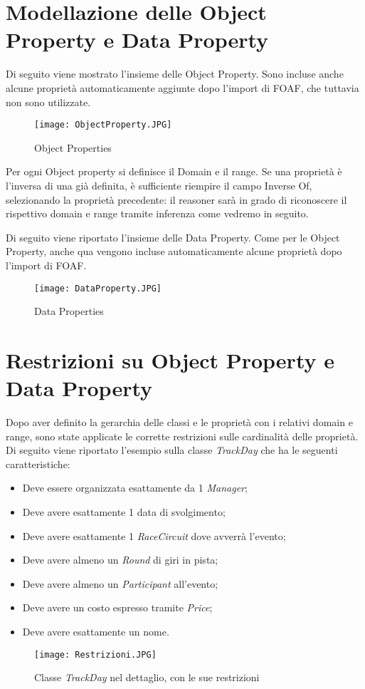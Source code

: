 \section{Modellazione delle Object Property e Data Property}
Di seguito viene mostrato l’insieme delle Object Property. Sono incluse anche alcune proprietà automaticamente aggiunte dopo l’import di FOAF, che tuttavia non sono utilizzate.
\begin{figure}[h]
	\centering
	\texttt{[image: ObjectProperty.JPG]}
	\caption{Object Properties}
\end{figure}
\clearpage
Per ogni Object property si definisce il Domain e il range. Se una proprietà è l'inversa di una già definita, è sufficiente riempire il campo Inverse Of, selezionando la proprietà precedente: il reasoner sarà in grado di riconoscere il rispettivo domain e range tramite inferenza come vedremo in seguito.
\\\par
Di seguito viene riportato l’insieme delle Data Property. Come per le Object Property, anche qua vengono incluse automaticamente alcune proprietà dopo l’import di FOAF. 
\begin{figure}[h]
	\centering
	\texttt{[image: DataProperty.JPG]}
	\caption{Data Properties}
\end{figure}
\section{Restrizioni su Object Property e Data Property}
Dopo aver definito la gerarchia delle classi e le proprietà con i relativi domain e range, sono state applicate le corrette restrizioni sulle cardinalità delle proprietà. Di seguito viene riportato l'esempio sulla classe \textit{TrackDay} che ha le seguenti caratteristiche:
\begin{itemize}
\item Deve essere organizzata esattamente da 1 \textit{Manager};
\item Deve avere esattamente 1 data di svolgimento;
\item Deve avere esattamente 1 \textit{RaceCircuit} dove avverrà l’evento;
\item Deve avere almeno un \textit{Round} di giri in pista;
\item Deve avere almeno un \textit{Participant} all’evento;
\item Deve avere un costo espresso tramite \textit{Price};
\item Deve avere esattamente un nome.
\end{itemize}
\begin{figure}[h]
	\centering
	\texttt{[image: Restrizioni.JPG]}
	\caption{Classe \textit{TrackDay} nel dettaglio, con le sue restrizioni}
\end{figure}
\clearpage
